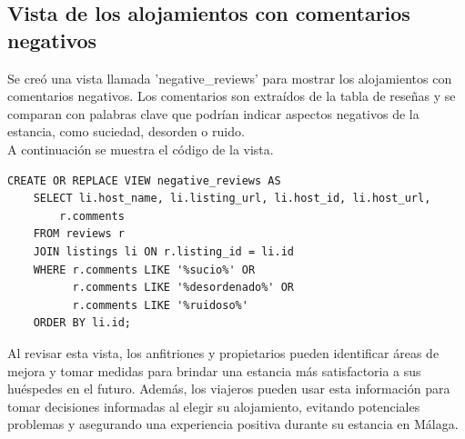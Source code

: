\begin{table}[h]
\centering
{}
\caption{Alojamientos peor valorados por categoría de propiedad.}
\end{table}

\subsection{Vista de los alojamientos con comentarios negativos}

Se creó una vista llamada 'negative\_reviews' para mostrar los alojamientos con comentarios negativos. Los comentarios son extraídos de la tabla de reseñas y se comparan con palabras clave que podrían indicar aspectos negativos de la estancia, como suciedad, desorden o ruido.\\A continuación se muestra el código de la vista.

\begin{verbatim}
CREATE OR REPLACE VIEW negative_reviews AS
    SELECT li.host_name, li.listing_url, li.host_id, li.host_url,
        r.comments
    FROM reviews r
    JOIN listings li ON r.listing_id = li.id
    WHERE r.comments LIKE '%sucio%' OR
          r.comments LIKE '%desordenado%' OR
          r.comments LIKE '%ruidoso%'
    ORDER BY li.id;
\end{verbatim}
Al revisar esta vista, los anfitriones y propietarios pueden identificar áreas de mejora y tomar medidas para brindar una estancia más satisfactoria a sus huéspedes en el futuro. Además, los viajeros pueden usar esta información para tomar decisiones informadas al elegir su alojamiento, evitando potenciales problemas y asegurando una experiencia positiva durante su estancia en Málaga.

